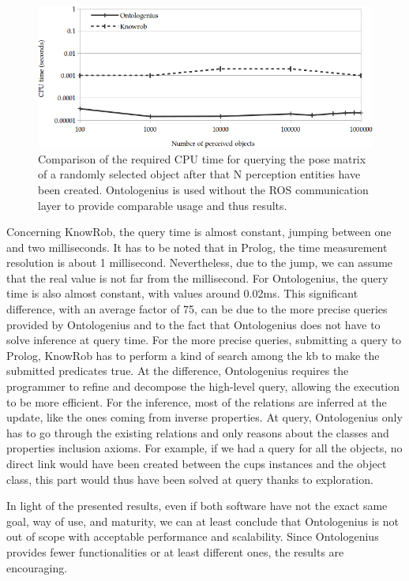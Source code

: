 \begin{figure}[ht!]
\centering
\includegraphics[width=\textwidth]{figures/chapter2/knowrob/Query.png}
\caption{\label{fig:chap2_knowrob_query} Comparison of the required CPU time for querying the pose matrix of a randomly selected object after that N perception entities have been created. Ontologenius is used without the ROS communication layer to provide comparable usage and thus results.}
\end{figure}

Concerning KnowRob, the query time is almost constant, jumping between one and two milliseconds. It has to be noted that in Prolog, the time measurement resolution is about 1 millisecond. Nevertheless, due to the jump, we can assume that the real value is not far from the millisecond. For Ontologenius, the query time is also almost constant, with values around 0.02ms. This significant difference, with an average factor of 75, can be due to the more precise queries provided by Ontologenius and to the fact that Ontologenius does not have to solve inference at query time. For the more precise queries, submitting a query to Prolog, KnowRob has to perform a kind of search among the \acrshort{kb} to make the submitted predicates true. At the difference, Ontologenius requires the programmer to refine and decompose the high-level query, allowing the execution to be more efficient. For the inference, most of the relations are inferred at the update, like the ones coming from inverse properties. At query, Ontologenius only has to go through the existing relations and only reasons about the classes and properties inclusion axioms. For example, if we had a query for all the objects, no direct link would have been created between the cups instances and the object class, this part would thus have been solved at query thanks to exploration.

In light of the presented results, even if both software have not the exact same goal, way of use, and maturity, we can at least conclude that Ontologenius is not out of scope with acceptable performance and scalability. Since Ontologenius provides fewer functionalities or at least different ones, the results are encouraging.%

